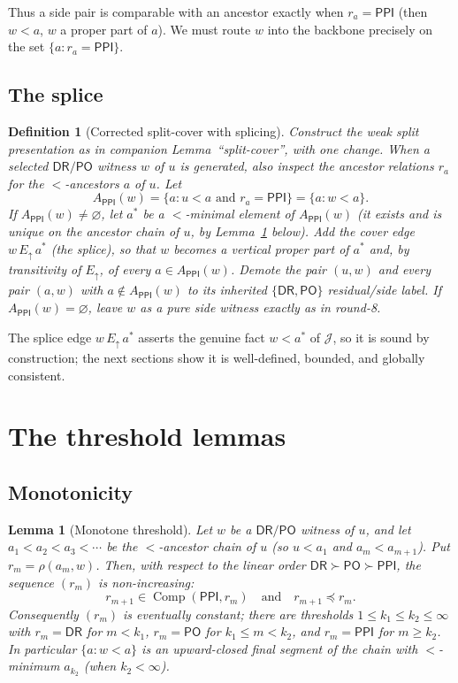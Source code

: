 \documentclass[11pt]{article}
\newtheorem{lemma}[theorem]{Lemma}
\newtheorem{definition}[theorem]{Definition}
\newcommand{\DR}{\mathsf{DR}}
\newcommand{\PO}{\mathsf{PO}}
\newcommand{\PPI}{\mathsf{PPI}}
\newcommand{\comp}{\operatorname{Comp}}
\newcommand{\Eup}{E_{\uparrow}}
\newcommand{\J}{\mathcal J}
\begin{document}
Thus a side pair is comparable with an ancestor exactly when $r_a=\PPI$ (then
$w<a$, $w$ a proper part of $a$).  We must route $w$ into the backbone precisely
on the set $\{a: r_a=\PPI\}$.

\subsection{The splice}

\begin{definition}[Corrected split-cover with splicing]\label{def:corrected}
Construct the weak split presentation as in companion Lemma~``split-cover'',
with one change.  When a selected $\DR/\PO$ witness $w$ of $u$ is generated, also
inspect the ancestor relations $r_a$ for the $<$-ancestors $a$ of $u$.  Let
\[
   A_\PPI(w)=\{a : u<a \text{ and } r_a=\PPI\}=\{a: w<a\}.
\]
If $A_\PPI(w)\ne\varnothing$, let $a^\ast$ be a $<$-minimal element of
$A_\PPI(w)$ (it exists and is unique on the ancestor chain of $u$, by
Lemma~\ref{lem:threshold} below).  Add the cover edge $w\,\Eup\,a^\ast$ (the
\emph{splice}), so that $w$ becomes a vertical proper part of $a^\ast$ and, by
transitivity of $\Eup$, of every $a\in A_\PPI(w)$.  Demote the pair $(u,w)$ and
every pair $(a,w)$ with $a\notin A_\PPI(w)$ to its inherited $\{\DR,\PO\}$
residual/side label.  If $A_\PPI(w)=\varnothing$, leave $w$ as a pure side
witness exactly as in round-8.
\end{definition}

The splice edge $w\,\Eup\,a^\ast$ asserts the genuine fact $w<a^\ast$ of $\J$, so
it is sound by construction; the next sections show it is well-defined,
bounded, and globally consistent.

\section{The threshold lemmas}

\subsection{Monotonicity}

\begin{lemma}[Monotone threshold]\label{lem:threshold}
Let $w$ be a $\DR/\PO$ witness of $u$, and let $a_1<a_2<a_3<\cdots$ be the
$<$-ancestor chain of $u$ (so $u<a_1$ and $a_m<a_{m+1}$).  Put $r_m=\rho(a_m,w)$.
Then, with respect to the linear order $\DR\succ\PO\succ\PPI$, the sequence
$(r_m)$ is non-increasing:
\[
   r_{m+1}\in\comp(\PPI,r_m)\quad\text{and}\quad r_{m+1}\preceq r_m .
\]
Consequently $(r_m)$ is eventually constant; there are thresholds
$1\le k_1\le k_2\le\infty$ with $r_m=\DR$ for $m<k_1$, $r_m=\PO$ for
$k_1\le m<k_2$, and $r_m=\PPI$ for $m\ge k_2$.  In particular $\{a:w<a\}$ is an
upward-closed final segment of the chain with $<$-minimum $a_{k_2}$ (when
$k_2<\infty$).
\end{lemma}
\end{document}
